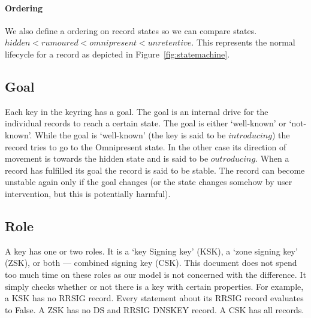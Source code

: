 \documentclass[twoside, a4paper]{article}
\begin{document}
\paragraph{Ordering} We also define a ordering on record states so 
we can compare states. $ hidden < rumoured < omnipresent < 
unretentive$. This represents the normal lifecycle for a record as 
depicted in Figure~\ref{fig:statemachine}.


\subsection{Goal}

Each key in the keyring has a goal. The goal is an internal drive 
for the individual records to reach a certain state. The goal is 
either `well-known' or `not-known'. While the goal is 
`well-known' (the key is said to be $introducing$) the record tries to go to the Omnipresent state. In 
the other case its direction of movement is towards the hidden 
state and is said to be $outroducing$. When a record has fulfilled its goal the record is said to be 
stable. The record can become unstable again only if the goal changes (or
the state changes somehow by user intervention, but this is potentially harmful).

\subsection{Role}

A key has one or two roles. It is a `key Signing key' (KSK), a `zone 
signing key' (ZSK), or both --- combined signing key (CSK). This 
document does not spend too much time on these roles as our model 
is not concerned with the difference. It simply checks whether or not 
there is a key with certain properties. For example, a KSK has no 
RRSIG record. Every statement about its RRSIG record evaluates to 
False. A ZSK has no DS and RRSIG DNSKEY record. A CSK has all records.
\end{document}
